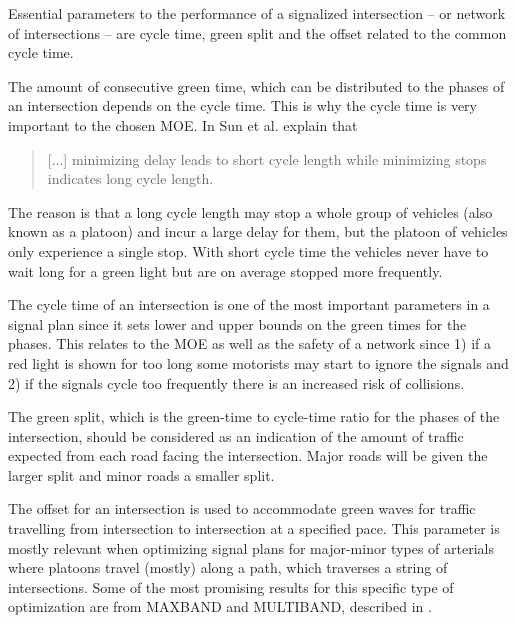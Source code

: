 \label{sec:theproblem}

Essential parameters to the performance of a signalized intersection
-- or network of intersections -- are cycle time, green split and the
offset related to the common cycle time.

The amount of consecutive green time, which can be distributed to the
phases of an intersection depends on the cycle time. This is why the
cycle time is very important to the chosen MOE. In \citet{41} Sun et
al. explain that 

\begin{quote}[...] minimizing delay leads to short cycle length while
minimizing stops indicates long cycle length.
\end{quote}

The reason is that a long cycle length may stop a whole group of
vehicles (also known as a platoon) and incur a large delay for them,
but the platoon of vehicles only experience a single stop. With short
cycle time the vehicles never have to wait long for a green light but
are on average stopped more frequently.


The cycle time of an intersection is one of the most important
parameters in a signal plan since it sets  lower and upper bounds on
the green times for the phases. This relates to the MOE as well as the
safety of a network since 1) if a red light is shown for too long some
motorists may start to ignore the signals and 2) if the signals
cycle too frequently there is an increased risk of collisions.

The green split, which is the green-time to cycle-time ratio for the
phases of the intersection, should be considered as an indication of
the amount of traffic expected from each road facing the
intersection. Major roads will be given the larger split and minor
roads a smaller split.

The offset for an intersection is used to accommodate green waves for
traffic travelling from intersection to intersection at a specified
pace. This parameter is mostly relevant when optimizing signal plans
for major-minor types of arterials where platoons travel (mostly)
along a path, which traverses a string of intersections. Some of the
most promising results for this specific type of optimization are from
MAXBAND and MULTIBAND, described in \citet{37}.

